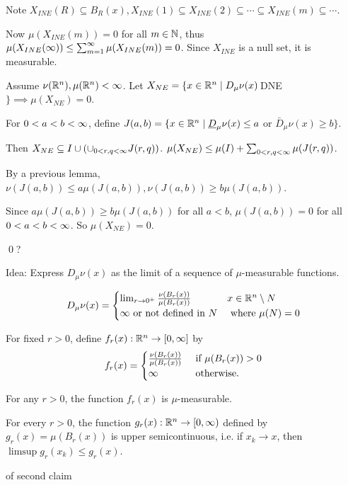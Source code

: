 \documentclass[x11names,reqno,14pt]{extarticle}
\begin{document}
Note $X_{INE}(R)\subseteq B_R(x), X_{INE}(1) \subseteq X_{INE}(2) \subseteq \cdots \subseteq X_{INE}(m)\subseteq\cdots$. 

Now $\mu(X_{INE}(m)) = 0$ for all $m \in \mathbb{N}$, thus $\mu(X_{INE}(\infty))\leq\sum_{m=1}^\infty\mu(X_{INE}(m)) = 0$. Since $X_{INE}$ is a null set, it is measurable.

Assume $\nu(\mathbb{R}^n), \mu(\mathbb{R}^n)<\infty$. Let $X_{NE} = \{x\in\mathbb{R}^n \mid D_\mu\nu(x)\, $DNE$\} \implies \mu(X_{NE}) = 0$.

For $0 < a < b < \infty$, define $J(a, b) = \{x\in\mathbb{R}^n\mid \underline{D}_\mu\nu(x) \leq a$ or $\bar{D}_{\mu}\nu(x)\geq b\}$. 

Then $X_{NE} \subseteq I \cup (\cup_{0<r,q<\infty}J(r, q))$. 
$\mu(X_{NE})\leq\mu(I) + \sum_{0<r, q< \infty}\mu(J(r, q))$. 

By a previous lemma, $\nu(J(a, b)) \leq a\mu(J(a, b)), \nu(J(a, b)) \geq b \mu(J(a, b))$. 

Since $a\mu(J(a, b)) \geq b\mu(J(a, b))$ for all $a < b$, $\mu(J(a, b)) = 0$ for all $0<a<b<\infty$. So $\mu(X_{NE}) = 0$. 

\qed ?

Idea: Express $D_\mu\nu(x)$ as the limit of a sequence of $\mu$-measurable functions. 

\claim

\[
D_\mu\nu(x) = 
\begin{cases} \lim_{r\to0^+}\frac{\nu(B_r(x))}{\mu(B_r(x))} & x \in \mathbb{R}^n\setminus N \\ \infty\text{ or not defined in }N & \text{ where }\mu(N) = 0 \\
\end{cases}
\]
\proof

For fixed $r > 0$, define $f_r(x):\mathbb{R}^n\to[0,\infty]$ by 
\[
f_r(x) = 
\begin{cases}
\frac{\nu(B_r(x))}{\mu(B_r(x))} & \text{ if }\mu(B_r(x))>0 \\
\infty & \text{ otherwise}. \\
\end{cases}
\]

\claim 

For any $r > 0$, the function $f_r(x)$ is $\mu$-measurable. 

\claim

For every $r > 0$, the function $g_r(x):\mathbb{R}^n\to[0,\infty)$ defined by $g_r(x) = \mu(B_r(x))$ is upper semicontinuous, i.e. if $x_k \to x$, then $\limsup g_r(x_k) \leq g_r(x)$. 

\proof of second claim
\end{document}
